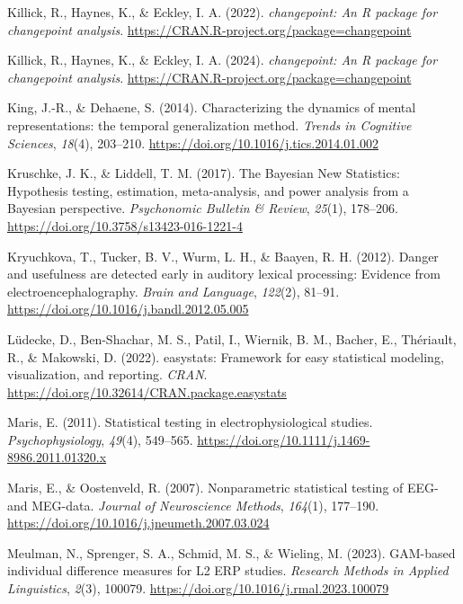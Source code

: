 \documentclass[
  doc,
  floatsintext,
  longtable,
  a4paper,
  nolmodern,
  notxfonts,
  notimes,
  donotrepeattitle,
  colorlinks=true,linkcolor=blue,citecolor=blue,urlcolor=blue]{apa7}
\newlength{\cslhangindent}
\newenvironment{CSLReferences}[2] %
 {\begin{list}{}{%
  \setlength{\itemindent}{0pt}
  \setlength{\leftmargin}{0pt}
  \setlength{\parsep}{0pt}
  \ifodd #1
   \setlength{\leftmargin}{\cslhangindent}
   \setlength{\itemindent}{-1\cslhangindent}
  \fi
  \setlength{\itemsep}{#2\baselineskip}}}
 {\end{list}}
\begin{document}
\begin{CSLReferences}{1}{0}
Killick, R., Haynes, K., \& Eckley, I. A. (2022). \emph{{changepoint}:
An {R} package for changepoint analysis}.
\url{https://CRAN.R-project.org/package=changepoint}

Killick, R., Haynes, K., \& Eckley, I. A. (2024). \emph{{changepoint}:
An {R} package for changepoint analysis}.
\url{https://CRAN.R-project.org/package=changepoint}

King, J.-R., \& Dehaene, S. (2014). Characterizing the dynamics of
mental representations: the temporal generalization method. \emph{Trends
in Cognitive Sciences}, \emph{18}(4), 203--210.
\url{https://doi.org/10.1016/j.tics.2014.01.002}

Kruschke, J. K., \& Liddell, T. M. (2017). The Bayesian New Statistics:
Hypothesis testing, estimation, meta-analysis, and power analysis from a
Bayesian perspective. \emph{Psychonomic Bulletin \& Review},
\emph{25}(1), 178--206. \url{https://doi.org/10.3758/s13423-016-1221-4}

Kryuchkova, T., Tucker, B. V., Wurm, L. H., \& Baayen, R. H. (2012).
Danger and usefulness are detected early in auditory lexical processing:
Evidence from electroencephalography. \emph{Brain and Language},
\emph{122}(2), 81--91. \url{https://doi.org/10.1016/j.bandl.2012.05.005}

Lüdecke, D., Ben-Shachar, M. S., Patil, I., Wiernik, B. M., Bacher, E.,
Thériault, R., \& Makowski, D. (2022). {easystats}: Framework for easy
statistical modeling, visualization, and reporting. \emph{CRAN}.
\url{https://doi.org/10.32614/CRAN.package.easystats}

Maris, E. (2011). Statistical testing in electrophysiological studies.
\emph{Psychophysiology}, \emph{49}(4), 549--565.
\url{https://doi.org/10.1111/j.1469-8986.2011.01320.x}

Maris, E., \& Oostenveld, R. (2007). Nonparametric statistical testing
of EEG- and MEG-data. \emph{Journal of Neuroscience Methods},
\emph{164}(1), 177--190.
\url{https://doi.org/10.1016/j.jneumeth.2007.03.024}

Meulman, N., Sprenger, S. A., Schmid, M. S., \& Wieling, M. (2023).
GAM-based individual difference measures for L2 ERP studies.
\emph{Research Methods in Applied Linguistics}, \emph{2}(3), 100079.
\url{https://doi.org/10.1016/j.rmal.2023.100079}


\end{CSLReferences}
\end{document}
